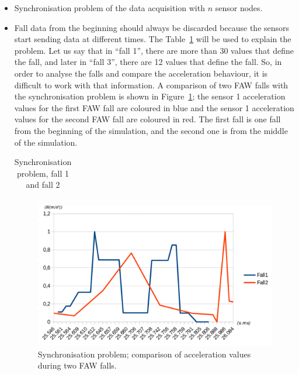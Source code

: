 \documentclass[journal]{IEEEtran}
\begin{document}
\begin{itemize}
 \item Synchronisation problem of the data acquisition with $n$ sensor nodes.
 \item Fall data from the beginning should always be discarded because
   the sensors start sending data at different times. The
   Table~\ref{tabla:Synchro} will be used to explain the problem. Let
   us say  
 that in ``fall 1'', there are more than 30 values that define the fall, and later in ``fall 3'', there are 
 12 values that define the fall. So, in order to analyse the falls and compare the acceleration behaviour, it is 
 difficult to work with that information. A comparison of two FAW falls with the synchronisation problem is shown
 in Figure~\ref{fig:synchronisation1}; the sensor 1 acceleration values for the first FAW fall are coloured in blue and the
 sensor 1 acceleration values for the second FAW fall are coloured in red. The first fall is one fall from the beginning
 of the simulation, and the second one is from the middle of the simulation.
 
 \begin{table}[!ht]
 \centering
 \begin{tabular}{*{5}{r}}
   
 \end{tabular}
 \caption{Synchronisation problem, fall 1 and fall 2}%
 \label{tabla:Synchro}
 \end{table}
 
 \begin{figure}[!ht]
  \centering
  \includegraphics[scale=0.2]{img/synchronisation1.png}
  \caption[Comparison acceleration during two FAW falls]{Synchronisation problem; comparison of acceleration values during two FAW falls.}
  \label{fig:synchronisation1}
 \end{figure}
 

\end{itemize}
\end{document}
